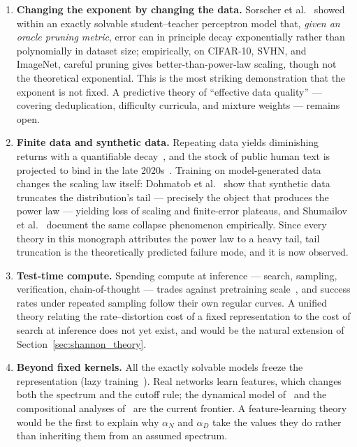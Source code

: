 \documentclass[11pt,a4paper]{article}
\theoremstyle{definition}
\begin{document}
\begin{enumerate}[leftmargin=2.0em]
  \item \textbf{Changing the exponent by changing the data.} Sorscher et al.~\cite{sorscher2022beyond} showed within an exactly solvable student--teacher perceptron model that, \emph{given an oracle pruning metric}, error can in principle decay exponentially rather than polynomially in dataset size; empirically, on CIFAR-10, SVHN, and ImageNet, careful pruning gives better-than-power-law scaling, though not the theoretical exponential. This is the most striking demonstration that the exponent is not fixed. A predictive theory of ``effective data quality'' --- covering deduplication, difficulty curricula, and mixture weights --- remains open.
  \item \textbf{Finite data and synthetic data.} Repeating data yields diminishing returns with a quantifiable decay~\cite{muennighoff2023scaling}, and the stock of public human text is projected to bind in the late 2020s~\cite{villalobos2024data}. Training on model-generated data changes the scaling law itself: Dohmatob et al.~\cite{dohmatob2024tale} show that synthetic data truncates the distribution's tail --- precisely the object that produces the power law --- yielding loss of scaling and finite-error plateaus, and Shumailov et al.~\cite{shumailov2024collapse} document the same collapse phenomenon empirically. Since every theory in this monograph attributes the power law to a heavy tail, tail truncation is the theoretically predicted failure mode, and it is now observed.
  \item \textbf{Test-time compute.} Spending compute at inference --- search, sampling, verification, chain-of-thought --- trades against pretraining scale~\cite{snell2024scaling,brown2024monkeys}, and success rates under repeated sampling follow their own regular curves. A unified theory relating the rate--distortion cost of a fixed representation to the cost of search at inference does not yet exist, and would be the natural extension of Section~\ref{sec:shannon_theory}.
  \item \textbf{Beyond fixed kernels.} All the exactly solvable models freeze the representation (lazy training~\cite{chizat2019lazy}). Real networks learn features, which changes both the spectrum and the cutoff rule; the dynamical model of~\cite{bordelon2024dynamical} and the compositional analyses of~\cite{cagnetta2024rhm} are the current frontier. A feature-learning theory would be the first to explain why $\alpha_N$ and $\alpha_D$ take the values they do rather than inheriting them from an assumed spectrum.

\end{enumerate}
\end{document}
